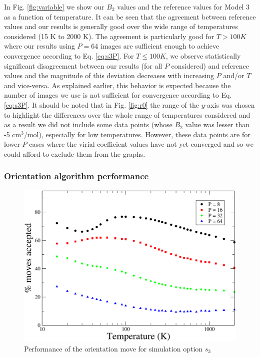                In Fig. \ref{fig:variable} we show our $B_2$ values and the reference values for Model 3 as a function of temperature. It can be seen that the agreement between reference values and our results is generally good over the wide range of temperatures considered (15 K to 2000 K). The agreement is particularly good for $T > 100 K$ where our results using $P = 64$ images are sufficient enough to achieve convergence according to Eq. \eqref{eq:s3P}. For $T \le 100 K$, we observe statistically significant disagreement between our results (for all $P$ considered) and reference values and the magnitude of this deviation decreases with increasing $P$ and/or $T$ and vice-versa. As explained earlier, this behavior is expected because the number of images we use is not sufficient for convergence according to Eq. \eqref{eq:s3P}. It should be noted that in Fig. \ref{fig:r0} the range of the $y$-axis was chosen to highlight the differences over the whole range of temperatures considered and as a result we did not include some data points (whose $B_2$ value was lesser than -5 cm$^3$/mol), especially for low temperatures. However, these data points are for lower-$P$ cases where the virial coefficient values have not yet converged and so we could afford to exclude them from the graphs.
                
            \subsubsection{Orientation algorithm performance}
                \begin{figure}[!htbp]
                    \centering
                    \includegraphics[scale=0.20,keepaspectratio]{Chapter-4/Figures/s3OrAcc.png}
                    \caption{Performance of the orientation move for simulation option $s_3$}
                    \label{fig:variableOrAcc}
                \end{figure}

